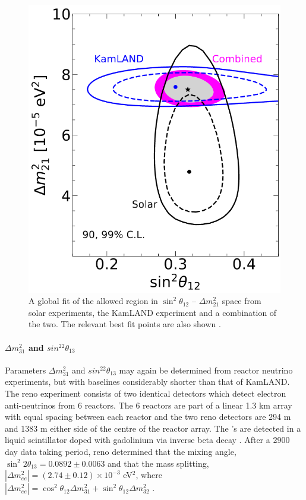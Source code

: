 \begin{figure}[h!]
    \centering
    \includegraphics[width = \smallfigwidth]{figures-chap2/theta_12.png}
    \caption[A global fit of the allowed region in $\sin^2{\theta_{12}}$ -- $\Delta m^2_{21}$ space from solar experiments and the KamLAND experiment.]{A global fit of the allowed region in $\sin^2{\theta_{12}}$ -- $\Delta m^2_{21}$ space from solar experiments, the KamLAND experiment and a combination of the two. The relevant best fit points are also shown
    \cite{2020_global_reassessment_of_the_neutrino_oscillation_picture}.}
    \label{fig:theta_21_deltamsq_21_best_fit}
\end{figure}


\paragraph{$\Delta m^2_{31}$ and $sin^22\theta_{13}$}
Parameters $\Delta m^2_{31}$ and $sin^22\theta_{13}$ may again be determined from reactor neutrino experiments, but with baselines considerably shorter than that of KamLAND. The \gls{reno} experiment consists of two identical detectors which detect electron anti-neutrinos from 6 reactors. The 6 reactors are part of a linear 1.3 km array with equal spacing between each reactor and the two \gls{reno} detectors are 294 m and 1383 m either side of the centre of the reactor array. The \nuebar's are detected in a liquid scintillator doped with gadolinium via inverse beta decay \cite{Measurement_of_Reactor_Antineutrino_Oscillation_Amplitude_and_Frequency_at_RENO}. After a 2900 day data taking period, \gls{reno} determined that the mixing angle, $\sin^2{2\theta_{13}} = 0.0892 \pm 0.0063$ and that the mass splitting, $|\Delta m^2_{ee}| = (2.74 \pm 0.12) \times 10^{-3}$ eV$^2$, where $|\Delta m^2_{ee}| = \cos^2{\theta_{12}}\Delta m^2_{31} + \sin^2{\theta_{12}}\Delta m^2_{32}$ \cite{RENO_2020}. 


